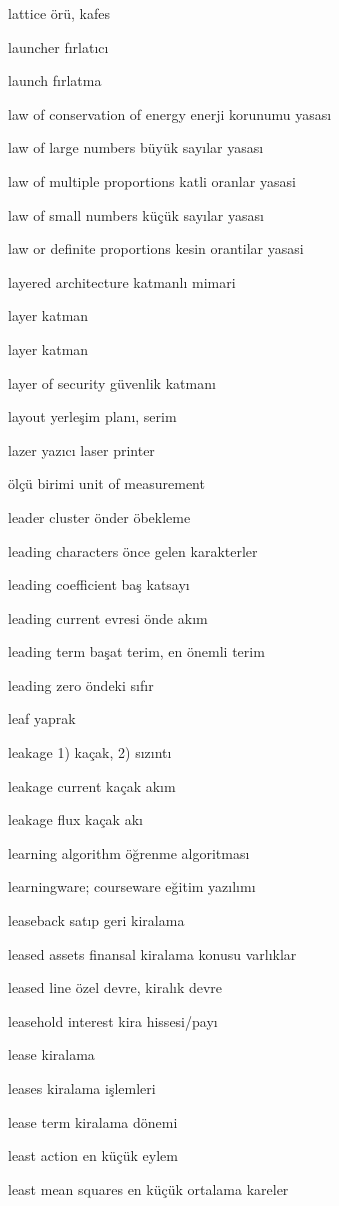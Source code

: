 \documentclass[12pt,fleqn]{article}\usepackage{../../common}
\begin{document}
lattice örü, kafes

launcher fırlatıcı

launch fırlatma

law of conservation of energy enerji korunumu yasası

law of large numbers büyük sayılar yasası

law of multiple proportions katli oranlar yasasi

law of small numbers küçük sayılar yasası

law or definite proportions kesin orantilar yasasi

layered architecture katmanlı mimari

layer katman

layer katman

layer of security güvenlik katmanı

layout yerleşim planı, serim

lazer yazıcı laser printer

ölçü birimi unit of measurement

leader cluster önder öbekleme

leading characters önce gelen karakterler

leading coefficient baş katsayı

leading current evresi önde akım

leading term başat terim, en önemli terim

leading zero öndeki sıfır

leaf yaprak

leakage 1) kaçak, 2) sızıntı

leakage current kaçak akım

leakage flux kaçak akı

learning algorithm öğrenme algoritması

learningware; courseware eğitim yazılımı

leaseback satıp geri kiralama

leased assets finansal kiralama konusu varlıklar

leased line özel devre, kiralık devre

leasehold interest kira hissesi/payı

lease kiralama

leases kiralama işlemleri

lease term kiralama dönemi

least action en küçük eylem

least mean squares en küçük ortalama kareler
\end{document}
